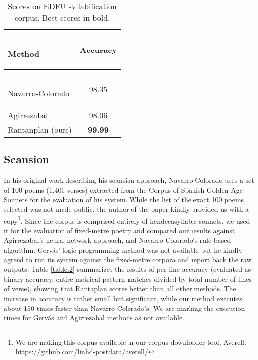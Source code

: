 \documentclass[a4paper,11pt,twocolumn,twoside]{article}
\begin{document}
\begin{table} [htbp]
\begin{center}
\begin{tabular} {lc}
  \hline\rule{-2pt}{15pt}
  {\bf Method} & {\bf Accuracy}\\
  \hline\rule{-4pt}{10pt}
  Navarro-Colorado & 98.35 \\
  Agirrezabal & 98.06 \\
  Rantanplan (ours) & \textbf{99.99} \\
\hline
\end{tabular}
\end{center}
\caption{\label{table.1}Scores on EDFU syllabification corpus. Best scores in bold.}
\end{table}

\subsection{Scansion}
In his original work describing his scansion approach, Navarro-Colorado uses a set of 100 poems (1,400 verses) extracted from the Corpus of Spanish Golden-Age Sonnets \cite{navarro2016metrical} for the evaluation of his system. While the list of the exact 100 poems selected was not made public, the author of the paper kindly provided us with a copy\footnote{We are making this corpus available in our corpus downloader tool, Averell: \url{https://github.com/linhd-postdata/averell/}}. Since the corpus is comprised entirely of hendecasyllable sonnets, we used it for the evaluation of fixed-metre poetry and compared our results against Agirrezabal's neural network approach, and Navarro-Colorado's rule-based algorithm. Gervás' logic programming method was not available but he kindly agreed to run its system against the fixed-metre corpora and report back the raw outputs. Table \ref{table.2} summarizes the results of per-line accuracy (evaluated as binary accuracy, entire metrical pattern matches divided by total number of lines of verse), showing that Rantaplan scores better than all other methods. The increase in accuracy is rather small but significant, while our method executes about 150 times faster than Navarro-Colorado's. We are marking the execution times for Gervás and Agirrezabal methods as not available.
\end{document}
